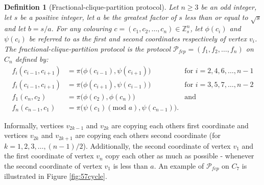 \documentclass{birkjour}
\theoremstyle{indenteddefinition}
\newtheorem{defn}[thm]{Definition}
\theoremstyle{indenteddefinition}
\numberwithin{equation}{section}
\renewcommand{\Pr}{\mathcal{P}}
\newcommand{\Z}{\mathbb{Z}}
\begin{document}
\begin{defn}[Fractional-clique-partition protocol]
\label{defn:P_fcp}
Let $n \geq 3$ be an odd integer, let $s$ be a positive integer, let $a$ be the greatest factor of $s$ less than or equal to $\sqrt{s}$ and let $b = s/a$. For any colouring $c = (c_1,c_2, \ldots ,c_n) \in \Z_s^n$, let $\phi(c_i)$ and $\psi(c_i)$ be referred to as the first and second coordinates respectively of vertex $v_i$. The \emph{fractional-clique-partition protocol} is the protocol $\Pr_{fcp} = (f_1,f_2, \ldots ,f_n)$ on $C_n$ defined by:
	\begin{align*}
	f_i(c_{i-1},c_{i+1}) & = \pi \big( \phi(c_{i-1}) , \psi(c_{i+1}) \big) & \mbox{for } i=2,4,6, \ldots ,n-1 \\
	f_i(c_{i-1},c_{i+1}) & = \pi \big( \phi(c_{i+1}) , \psi(c_{i-1}) \big) & \mbox{for } i=3,5,7, \ldots ,n-2 \\
	f_1(c_n,c_2) & = \pi \big( \phi(c_2) , \phi(c_n) \big) & \mbox{and} \\
	f_n(c_{n-1},c_1) & = \pi \big( \psi(c_1) (\mbox{mod } a), \psi(c_{n-1}) \big).
	\end{align*}
\end{defn}

Informally, vertices $v_{2k-1}$ and $v_{2k}$ are copying each others first coordinate and vertices $v_{2k}$ and $v_{2k+1}$ are copying each others second coordinate (for $k = 1,2,3, \ldots , (n-1)/2$). Additionally, the second coordinate of vertex $v_1$ and the first coordinate of vertex $v_n$ copy each other as much as possible - whenever the second coordinate of vertex $v_1$ is less than $a$. An example of $\Pr_{fcp}$ on $C_7$ is illustrated in Figure \ref{fig:57cycle}.
\end{document}
